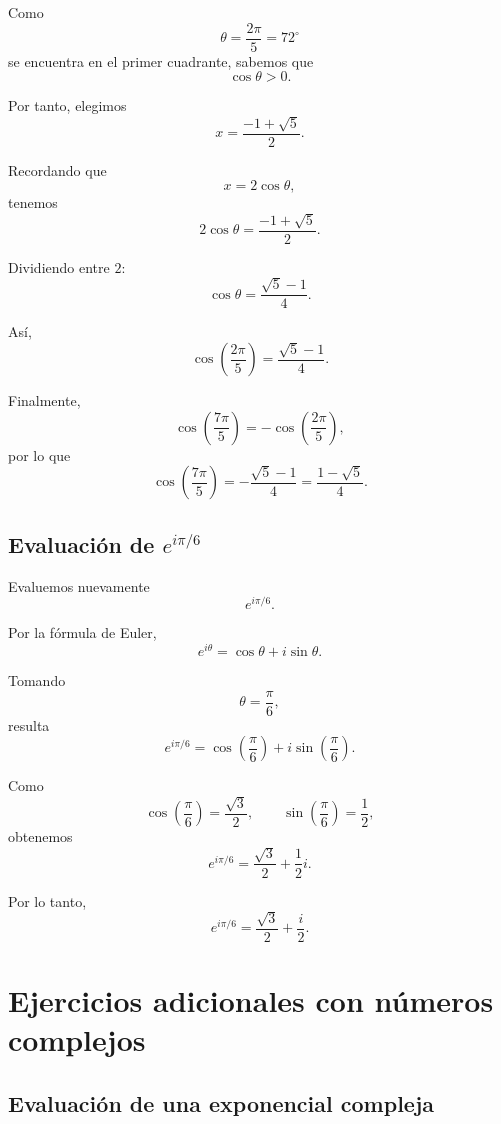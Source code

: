 \documentclass[12pt]{article}
\begin{document}
Como
\[
\theta=\frac{2\pi}{5}=72^\circ
\]
se encuentra en el primer cuadrante, sabemos que
\[
\cos\theta>0.
\]

Por tanto, elegimos
\[
x=\frac{-1+\sqrt{5}}{2}.
\]

Recordando que
\[
x=2\cos\theta,
\]
tenemos
\[
2\cos\theta
=
\frac{-1+\sqrt{5}}{2}.
\]

Dividiendo entre $2$:
\[
\cos\theta
=
\frac{\sqrt{5}-1}{4}.
\]

Así,
\[
\boxed{
\cos\left(\frac{2\pi}{5}\right)
=
\frac{\sqrt{5}-1}{4}
}.
\]

Finalmente,
\[
\cos\left(\frac{7\pi}{5}\right)
=
-\cos\left(\frac{2\pi}{5}\right),
\]
por lo que
\[
\boxed{
\cos\left(\frac{7\pi}{5}\right)
=
-\frac{\sqrt{5}-1}{4}
=
\frac{1-\sqrt{5}}{4}
}.
\]

\subsection{Evaluación de $e^{i\pi/6}$}

Evaluemos nuevamente
\[
e^{i\pi/6}.
\]

Por la fórmula de Euler,
\[
e^{i\theta}
=
\cos\theta+i\sin\theta.
\]

Tomando
\[
\theta=\frac{\pi}{6},
\]
resulta
\[
e^{i\pi/6}
=
\cos\left(\frac{\pi}{6}\right)
+
i\sin\left(\frac{\pi}{6}\right).
\]

Como
\[
\cos\left(\frac{\pi}{6}\right)
=
\frac{\sqrt{3}}{2},
\qquad
\sin\left(\frac{\pi}{6}\right)
=
\frac{1}{2},
\]
obtenemos
\[
e^{i\pi/6}
=
\frac{\sqrt{3}}{2}
+
\frac{1}{2}i.
\]

Por lo tanto,
\[
\boxed{
e^{i\pi/6}
=
\frac{\sqrt{3}}{2}
+
\frac{i}{2}
}.
\]

\section{Ejercicios adicionales con números complejos}

\subsection{Evaluación de una exponencial compleja}
\end{document}
